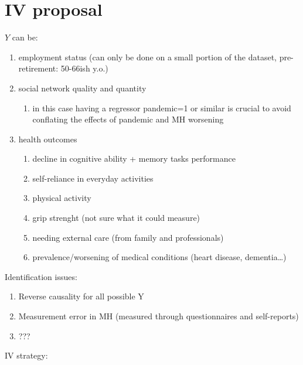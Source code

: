 \documentclass{article}
\begin{document}
    \section{IV proposal}
    $Y$ can be:
    \begin{enumerate}
        \item employment status (can only be done on a small portion of the dataset, pre-retirement: 50-66ish y.o.)
        \item social network quality and quantity 
            \begin{enumerate}
                \item in this case having a regressor pandemic=1 or similar is crucial to avoid conflating the effects of pandemic and MH worsening 
            \end{enumerate}
        \item health outcomes
            \begin{enumerate}
                \item decline in cognitive ability + memory tasks performance
                \item self-reliance in everyday activities
                \item physical activity 
                \item grip strenght (not sure what it could measure)
                \item needing external care (from family and professionals)
                \item prevalence/worsening of medical conditions (heart disease, dementia\dots)
            \end{enumerate}
    \end{enumerate}
Identification issues:
\begin{enumerate}
    \item Reverse causality for all possible Y 
    \item Measurement error in MH (measured through questionnaires and self-reports)
    \item ???
\end{enumerate}
IV strategy:
\end{document}
